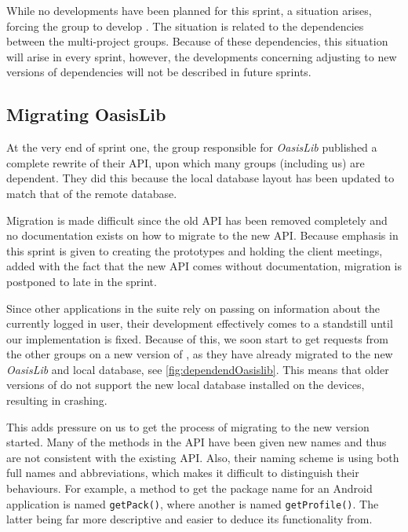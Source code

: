 While no developments have been planned for this sprint, a situation arises, forcing the group to develop \launcher.
The situation is related to the dependencies between the multi-project groups.
Because of these dependencies, this situation will arise in every sprint, however, the developments concerning adjusting to new versions of dependencies will not be described in future sprints.

\subsection{Migrating OasisLib}\label{sec:oasismigration}
At the very end of sprint one, the group responsible for \textit{OasisLib} published a complete rewrite of their API, upon which many groups (including us) are dependent.
They did this because the local database layout has been updated to match that of the remote database.

Migration is made difficult since the old API has been removed completely and no documentation exists on how to migrate to the new API.
Because emphasis in this sprint is given to creating the prototypes and holding the client meetings, added with the fact that the new API comes without documentation, migration is postponed to late in the sprint.

Since other applications in the \giraf suite rely on \launcher passing on information about the currently logged in user, their development effectively comes to a standstill until our implementation is fixed.
Because of this, we soon start to get requests from the other groups on a new version of \launcher, as they have already migrated to the new \textit{OasisLib} and local database, see \cref{fig:dependendOasislib}.
This means that older versions of \launcher do not support the new local database installed on the devices, resulting in \launcher crashing.


This adds pressure on us to get the process of migrating to the new version started.
Many of the methods in the API have been given new names and thus are not consistent with the existing API.
Also, their naming scheme is using both full names and abbreviations, which makes it difficult to distinguish their behaviours.
For example, a method to get the package name for an Android application is named \lstinline{getPack()}, where another is named \lstinline{getProfile()}.
The latter being far more descriptive and easier to deduce its functionality from.

